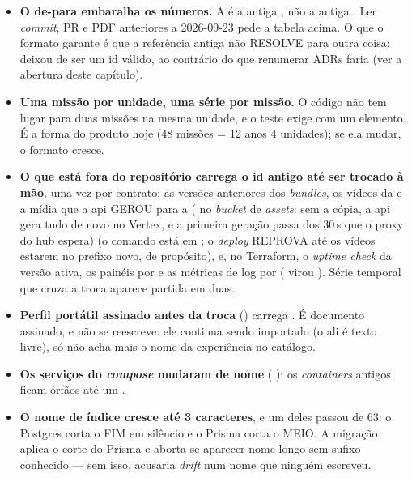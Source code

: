 \begin{itemize}
  \item \textbf{O de-para embaralha os números.} A  é a antiga
    , não a antiga . Ler \emph{commit}, PR e PDF
    anteriores a 2026-09-23 pede a tabela acima. O que o formato garante é que
    a referência antiga não RESOLVE para outra coisa:  deixou de ser
    um id válido, ao contrário do que renumerar ADRs faria (ver a abertura
    deste capítulo).
  \item \textbf{Uma missão por unidade, uma série por missão.} O código não
    tem lugar para duas missões na mesma unidade, e o teste exige
     com um elemento. É a forma do produto hoje (48 missões = 12
    anos \texttimes{} 4 unidades); se ela mudar, o formato cresce.
  \item \textbf{O que está fora do repositório carrega o id antigo até ser
    trocado à mão}, uma vez por contrato: as versões anteriores dos
    \emph{bundles}, os vídeos da  e a mídia que a api GEROU para a
     ( no \emph{bucket} de
    \emph{assets}: sem a cópia, a api gera tudo de novo no Vertex, e a primeira
    geração passa dos 30\,s que o proxy do hub espera) (o comando está
    em ; o \emph{deploy} REPROVA até os vídeos estarem no
    prefixo novo, de propósito), e, no Terraform, o \emph{uptime check} da
    versão ativa, os painéis por  e as métricas de log por
     ( virou ). Série temporal que cruza
    a troca aparece partida em duas.
  \item \textbf{Perfil portátil assinado antes da troca} ()
    carrega . É documento assinado, e não se reescreve:
    ele continua sendo importado (o  ali é texto livre), só não acha
    mais o nome da experiência no catálogo.
  \item \textbf{Os serviços do \emph{compose} mudaram de nome}
    ( \seta{} ): os \emph{containers} antigos ficam
    órfãos até um .
  \item \textbf{O nome de índice cresce até 3 caracteres}, e um deles passou de
    63: o Postgres corta o FIM em silêncio e o Prisma corta o MEIO. A migração
    aplica o corte do Prisma e aborta se aparecer nome longo sem sufixo
    conhecido --- sem isso,  acusaria \emph{drift} num
    nome que ninguém escreveu.
\end{itemize}

